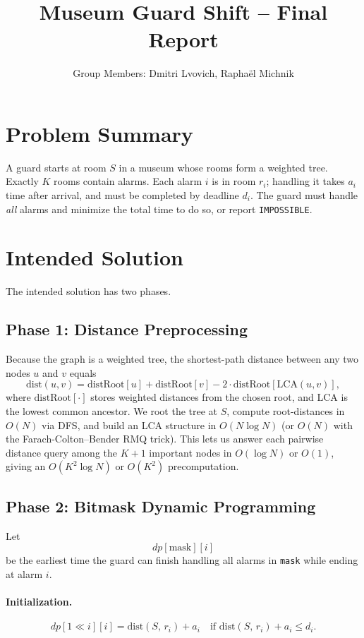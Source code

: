 \documentclass[11pt]{article}
\title{Museum Guard Shift -- Final Report}
\author{Group Members: Dmitri Lvovich, Raphaël Michnik}
\date{}
\begin{document}
\maketitle

\section*{Problem Summary}

A guard starts at room $S$ in a museum whose rooms form a weighted tree.
Exactly $K$ rooms contain alarms.  Each alarm $i$ is in room $r_i$; handling it
takes $a_i$ time after arrival, and must be completed by deadline $d_i$.
The guard must handle \emph{all} alarms and minimize the total time to do so,
or report \texttt{IMPOSSIBLE}.

\section*{Intended Solution}

The intended solution has two phases.

\subsection*{Phase 1: Distance Preprocessing}

Because the graph is a weighted tree, the shortest-path distance between any
two nodes $u$ and $v$ equals
\[
  \mathrm{dist}(u,v)
  = \mathrm{distRoot}[u] + \mathrm{distRoot}[v]
    - 2\cdot\mathrm{distRoot}[\mathrm{LCA}(u,v)],
\]
where $\mathrm{distRoot}[\cdot]$ stores weighted distances from the chosen root,
and $\mathrm{LCA}$ is the lowest common ancestor.  We root the tree at $S$,
compute root-distances in $O(N)$ via DFS, and build an LCA structure in
$O(N\log N)$ (or $O(N)$ with the Farach-Colton--Bender RMQ trick).
This lets us answer each pairwise distance query among the $K+1$ important
nodes in $O(\log N)$ or $O(1)$, giving an $O(K^2\log N)$ or $O(K^2)$
pre\-computation.

\subsection*{Phase 2: Bitmask Dynamic Programming}

Let
\[
  dp[\text{mask}][i]
\]
be the earliest time the guard can finish handling all alarms in \texttt{mask}
while ending at alarm $i$.

\paragraph{Initialization.}
\[
  dp[1\ll i][i] = \mathrm{dist}(S,\,r_i) + a_i
  \quad\text{if } \mathrm{dist}(S,\,r_i)+a_i \le d_i.
\]
\end{document}
